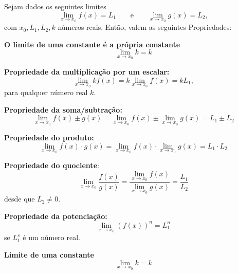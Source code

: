 \cleardoublepage\documentclass[../main.tex]{subfiles}
\begin{document}
Sejam dados os seguintes limites
\begin{equation*}
  \lim_{x\to x_0} f(x) = L_1\qquad\text{e}\qquad \lim_{x\to x_0} g(x) = L_2,
\end{equation*}
com $x_0, L_1, L_2, k$ números reais. Então, valem as seguintes Propriedades:
\begin{compactenum}[a)]
\item \textbf{O limite de uma constante é a própria constante}
\begin{equation*}
    \lim_{x\to x_0} k = k
  \end{equation*}
\item \textbf{Propriedade da multiplicação por um escalar:}
  \begin{equation*}
    \lim_{x\to x_0} kf(x) = k\lim_{x\to x_0} f(x) = kL_1,
  \end{equation*}
  para qualquer número real $k$.
\item \textbf{Propriedade da soma/subtração:}
  \begin{equation*}
    \lim_{x\to x_0} f(x) \pm g(x) = \lim_{x\to x_0} f(x) \pm \lim_{x\to x_0} g(x) = L_1 \pm L_2
  \end{equation*}
\item \textbf{Propriedade do produto:}
  \begin{equation*}
    \lim_{x\to x_0} f(x) \cdot g(x) = \lim_{x\to x_0} f(x) \cdot \lim_{x\to x_0} g(x) = L_1 \cdot L_2
  \end{equation*}
\item \textbf{Propriedade do quociente}:
  \begin{equation*}
    \lim_{x\to x_0} \frac{f(x)}{g(x)} = \frac{\lim_{x\to x_0} f(x)}{\lim_{x\to x_0} g(x)} = \frac{L_1}{L_2}
  \end{equation*}
  desde que $L_2\neq 0$.
\item \textbf{Propriedade da potenciação:}
  \begin{equation*}
    \lim_{x\to x_0} (f(x))^n = L_1^n
  \end{equation*}
  se $L_1^s$ é um número real.
  \item \textbf{Limite de uma constante}$$\lim_{x\to x_0} k = k$$
\end{compactenum}
\end{document}
